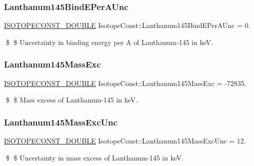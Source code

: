 \subsubsection{\texorpdfstring{Lanthanum145\+Bind\+E\+Per\+A\+Unc}{Lanthanum145BindEPerAUnc}}
{\footnotesize\ttfamily \mbox{\hyperlink{group___isotope_const-_macros_ga8f45a7272ce02c0b4c65c44636ed719a}{I\+S\+O\+T\+O\+P\+E\+C\+O\+N\+S\+T\+\_\+\+D\+O\+U\+B\+LE}} Isotope\+Const\+::\+Lanthanum145\+Bind\+E\+Per\+A\+Unc = 0.}

\$ \$ Uncertainty in binding energy per A of Lanthanum-\/145 in keV. \mbox{\label{group___isotope_const-_lanthanum-_la145_ga61fdf1b9a7361e85974892bcbf36e584}} 
\subsubsection{\texorpdfstring{Lanthanum145\+Mass\+Exc}{Lanthanum145MassExc}}
{\footnotesize\ttfamily \mbox{\hyperlink{group___isotope_const-_macros_ga8f45a7272ce02c0b4c65c44636ed719a}{I\+S\+O\+T\+O\+P\+E\+C\+O\+N\+S\+T\+\_\+\+D\+O\+U\+B\+LE}} Isotope\+Const\+::\+Lanthanum145\+Mass\+Exc = -\/72835.}

\$ \$ Mass excess of Lanthanum-\/145 in keV. \mbox{\label{group___isotope_const-_lanthanum-_la145_ga3223973a146f6de413c3912c32f35327}} 
\subsubsection{\texorpdfstring{Lanthanum145\+Mass\+Exc\+Unc}{Lanthanum145MassExcUnc}}
{\footnotesize\ttfamily \mbox{\hyperlink{group___isotope_const-_macros_ga8f45a7272ce02c0b4c65c44636ed719a}{I\+S\+O\+T\+O\+P\+E\+C\+O\+N\+S\+T\+\_\+\+D\+O\+U\+B\+LE}} Isotope\+Const\+::\+Lanthanum145\+Mass\+Exc\+Unc = 12.}

\$ \$ Uncertainty in mass excess of Lanthanum-\/145 in keV. \mbox{\label{group___isotope_const-_lanthanum-_la145_gabefbd59f7b189c46d23d5d80e6d33b7a}} 
